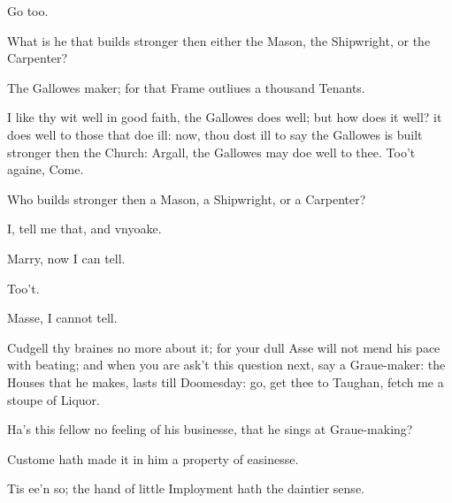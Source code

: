 \documentclass[a5paper,DIV=calc,11pt]{scrbook}
\begin{document}
\begin{drama*}
     Go too.
    
     What is he that builds stronger then either the Mason, the Shipwright, or the Carpenter?
    
     The Gallowes maker; for that Frame outliues a thousand Tenants.
    
     I like thy wit well in good faith, the Gallowes does well; but how does it well? it does well to those that doe ill: now, thou dost ill to say the Gallowes is built stronger then the Church: Argall, the Gallowes may doe well to thee. Too't againe, Come.
    
     Who builds stronger then a Mason, a Shipwright, or a Carpenter?
    
     I, tell me that, and vnyoake.
    
     Marry, now I can tell.
    
     Too't.
    
     Masse, I cannot tell.
    
    
     Cudgell thy braines no more about it; for your dull Asse will not mend his pace with beating; and when you are ask't this question next, say a Graue-maker: the Houses that he makes, lasts till Doomesday: go, get thee to Taughan, fetch me a stoupe of Liquor.\\
    
    \hamspeaks Ha's this fellow no feeling of his businesse, that he sings at Graue-making?
    
    \horspeaks Custome hath made it in him a property of easinesse.
    
    \hamspeaks Tis ee'n so; the hand of little Imployment hath the daintier sense.
    
    

\end{drama*}
\end{document}
